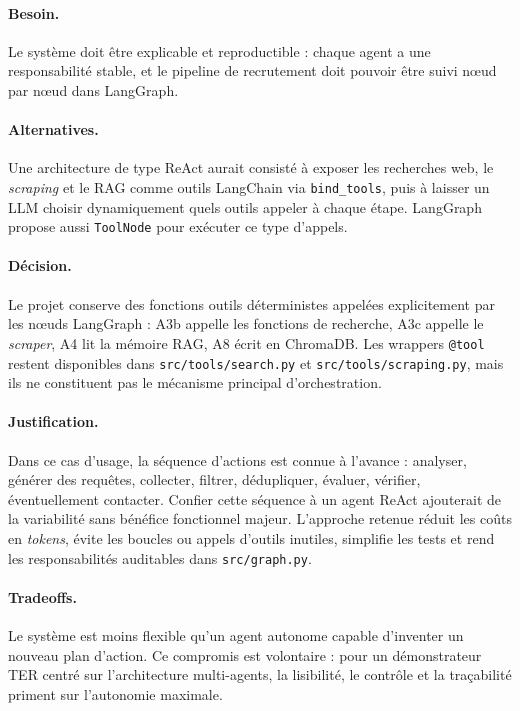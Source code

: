 \paragraph{Besoin.} Le système doit être explicable et reproductible : chaque agent a une responsabilité stable, et le pipeline de recrutement doit pouvoir être suivi nœud par nœud dans LangGraph.

\paragraph{Alternatives.} Une architecture de type ReAct aurait consisté à exposer les recherches web, le \textit{scraping} et le RAG comme outils LangChain via \texttt{bind\_tools}, puis à laisser un LLM choisir dynamiquement quels outils appeler à chaque étape. LangGraph propose aussi \texttt{ToolNode} pour exécuter ce type d'appels.

\paragraph{Décision.} Le projet conserve des fonctions outils déterministes appelées explicitement par les nœuds LangGraph : A3b appelle les fonctions de recherche, A3c appelle le \textit{scraper}, A4 lit la mémoire RAG, A8 écrit en ChromaDB. Les wrappers \texttt{@tool} restent disponibles dans \texttt{src/tools/search.py} et \texttt{src/tools/scraping.py}, mais ils ne constituent pas le mécanisme principal d'orchestration.

\paragraph{Justification.} Dans ce cas d'usage, la séquence d'actions est connue à l'avance : analyser, générer des requêtes, collecter, filtrer, dédupliquer, évaluer, vérifier, éventuellement contacter. Confier cette séquence à un agent ReAct ajouterait de la variabilité sans bénéfice fonctionnel majeur. L'approche retenue réduit les coûts en \textit{tokens}, évite les boucles ou appels d'outils inutiles, simplifie les tests et rend les responsabilités auditables dans \texttt{src/graph.py}.

\paragraph{Tradeoffs.} Le système est moins flexible qu'un agent autonome capable d'inventer un nouveau plan d'action. Ce compromis est volontaire : pour un démonstrateur TER centré sur l'architecture multi-agents, la lisibilité, le contrôle et la traçabilité priment sur l'autonomie maximale.

